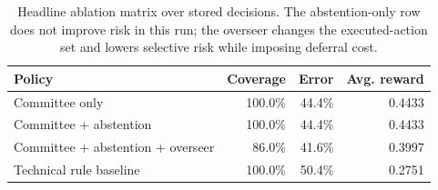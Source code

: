 
\begin{table}[H]
\centering
\caption{Headline ablation matrix over stored decisions. The abstention-only row does not improve risk in this run; the overseer changes the executed-action set and lowers selective risk while imposing deferral cost.}
\label{tab:ablation}
\scriptsize
\begin{tabularx}{\columnwidth}{Xrrr}
\toprule
Policy & Coverage & Error & Avg. reward \\
\midrule
Committee only & 100.0\% & 44.4\% & 0.4433 \\
Committee + abstention & 100.0\% & 44.4\% & 0.4433 \\
Committee + abstention + overseer & 86.0\% & 41.6\% & 0.3997 \\
Technical rule baseline & 100.0\% & 50.4\% & 0.2751 \\
\bottomrule
\end{tabularx}
\end{table}
